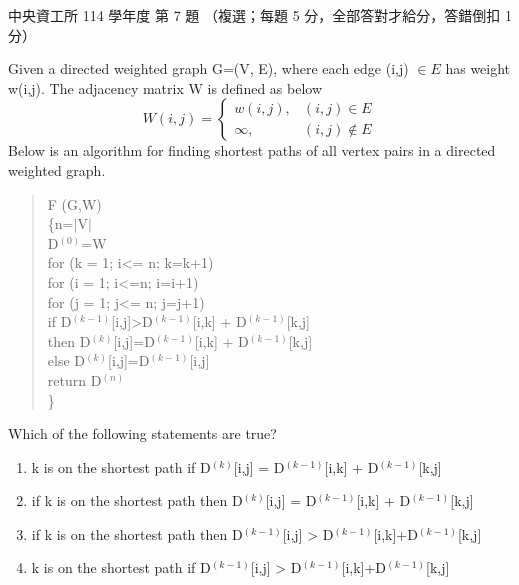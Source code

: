 \begin{pastexam}[label={px:ncu-114-dsa-07}]{中央資工所 114 學年度 第 7 題}
（複選；每題 5 分，全部答對才給分，答錯倒扣 1 分）

Given a directed weighted graph G=(V, E), where each edge (i,j) $\in E$ has weight w(i,j). The adjacency
matrix W is defined as below
\[
W(i,j)=\begin{cases} w(i,j), & (i,j)\in E\\ \infty, & (i,j)\notin E\end{cases}
\]
Below is an algorithm for finding shortest paths of all vertex pairs in a directed weighted graph.
\begin{quote}
F (G,W)\\
\{\quad n=$|$V$|$\\
\hspace*{2em}D$^{(0)}$=W\\
\hspace*{2em}for (k = 1; i<= n; k=k+1)\\
\hspace*{3em}for (i = 1; i<=n; i=i+1)\\
\hspace*{4em}for (j = 1; j<= n; j=j+1)\\
\hspace*{5em}if D$^{(k-1)}$[i,j]>D$^{(k-1)}$[i,k] + D$^{(k-1)}$[k,j]\\
\hspace*{5em}then D$^{(k)}$[i,j]=D$^{(k-1)}$[i,k] + D$^{(k-1)}$[k,j]\\
\hspace*{5em}else D$^{(k)}$[i,j]=D$^{(k-1)}$[i,j]\\
\hspace*{2em}return D$^{(n)}$\\
\}
\end{quote}
Which of the following statements are true?
\begin{enumerate}[label=(\alph*)]
\item k is on the shortest path if D$^{(k)}$[i,j] = D$^{(k-1)}$[i,k] + D$^{(k-1)}$[k,j]
\item if k is on the shortest path then D$^{(k)}$[i,j] = D$^{(k-1)}$[i,k] + D$^{(k-1)}$[k,j]
\item if k is on the shortest path then D$^{(k-1)}$[i,j] > D$^{(k-1)}$[i,k]+D$^{(k-1)}$[k,j]
\item k is on the shortest path if D$^{(k-1)}$[i,j] > D$^{(k-1)}$[i,k]+D$^{(k-1)}$[k,j]
\end{enumerate}
\end{pastexam}

